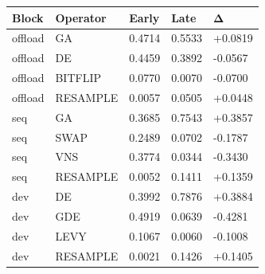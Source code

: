 \begin{tabular}{lllll}
\hline
Block & Operator & Early & Late & Δ \\
\hline
offload & GA & 0.4714 & 0.5533 & +0.0819 \\
offload & DE & 0.4459 & 0.3892 & -0.0567 \\
offload & BITFLIP & 0.0770 & 0.0070 & -0.0700 \\
offload & RESAMPLE & 0.0057 & 0.0505 & +0.0448 \\
seq & GA & 0.3685 & 0.7543 & +0.3857 \\
seq & SWAP & 0.2489 & 0.0702 & -0.1787 \\
seq & VNS & 0.3774 & 0.0344 & -0.3430 \\
seq & RESAMPLE & 0.0052 & 0.1411 & +0.1359 \\
dev & DE & 0.3992 & 0.7876 & +0.3884 \\
dev & GDE & 0.4919 & 0.0639 & -0.4281 \\
dev & LEVY & 0.1067 & 0.0060 & -0.1008 \\
dev & RESAMPLE & 0.0021 & 0.1426 & +0.1405 \\
\hline
\end{tabular}